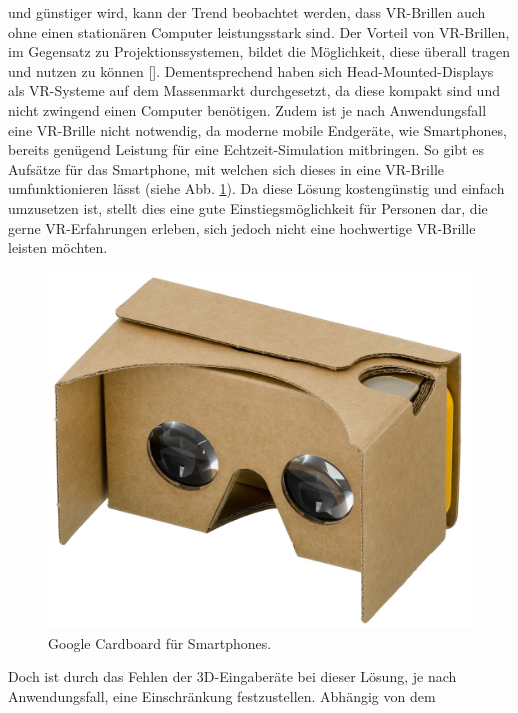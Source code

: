 \documentclass[a4paper,12pt,oneside]{article}
\begin{document}
        und günstiger wird, kann der Trend beobachtet werden, dass VR-Brillen auch ohne
        einen stationären Computer leistungsstark sind.
        Der Vorteil von VR-Brillen, im Gegensatz zu Projektionssystemen, bildet die 
        Möglichkeit, diese überall tragen und nutzen zu können [\cite[129]{Dorner2013}].
        Dementsprechend haben sich Head-Mounted-Displays als VR-Systeme auf dem Massenmarkt
        durchgesetzt, da diese kompakt sind und nicht zwingend einen Computer benötigen.
        Zudem ist je nach Anwendungsfall eine VR-Brille nicht notwendig, da moderne 
        mobile Endgeräte, wie Smartphones, bereits genügend Leistung für eine 
        Echtzeit-Simulation mitbringen. So gibt es Aufsätze für das Smartphone,
        mit welchen sich dieses in eine VR-Brille umfunktionieren lässt (siehe Abb. \ref{fig:google-cardboard}).
        Da diese Lösung kostengünstig und einfach umzusetzen ist, stellt dies eine
        gute Einstiegsmöglichkeit für Personen dar, die gerne
        VR-Erfahrungen erleben, sich jedoch nicht eine hochwertige VR-Brille leisten
        möchten.
        \begin{figure}[t]
          \centering
          \includegraphics[scale=0.7]{img/google-cardboard.jpg}
          \caption{Google Cardboard für Smartphones.}
          \label{fig:google-cardboard}
        \end{figure}
        Doch ist durch das Fehlen der 3D-Eingaberäte bei dieser Lösung, je
        nach Anwendungsfall, eine Einschränkung festzustellen. Abhängig von dem 
\end{document}
